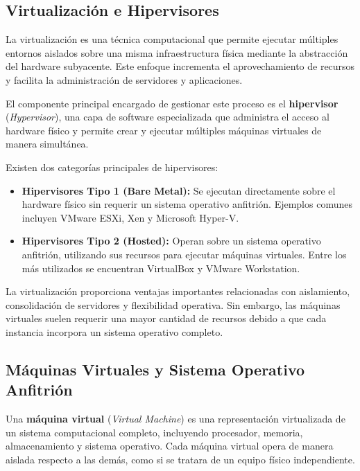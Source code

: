 \subsection{Virtualización e Hipervisores}

La virtualización es una técnica computacional que permite ejecutar múltiples entornos aislados sobre una misma infraestructura física mediante la abstracción del hardware subyacente. Este enfoque incrementa el aprovechamiento de recursos y facilita la administración de servidores y aplicaciones.

El componente principal encargado de gestionar este proceso es el \textbf{hipervisor} (\textit{Hypervisor}), una capa de software especializada que administra el acceso al hardware físico y permite crear y ejecutar múltiples máquinas virtuales de manera simultánea.

Existen dos categorías principales de hipervisores:

\begin{itemize}
\item \textbf{Hipervisores Tipo 1 (Bare Metal):} Se ejecutan directamente sobre el hardware físico sin requerir un sistema operativo anfitrión. Ejemplos comunes incluyen VMware ESXi, Xen y Microsoft Hyper-V.

\item \textbf{Hipervisores Tipo 2 (Hosted):} Operan sobre un sistema operativo anfitrión, utilizando sus recursos para ejecutar máquinas virtuales. Entre los más utilizados se encuentran VirtualBox y VMware Workstation.
\end{itemize}

La virtualización proporciona ventajas importantes relacionadas con aislamiento, consolidación de servidores y flexibilidad operativa. Sin embargo, las máquinas virtuales suelen requerir una mayor cantidad de recursos debido a que cada instancia incorpora un sistema operativo completo.

\subsection{Máquinas Virtuales y Sistema Operativo Anfitrión}

Una \textbf{máquina virtual} (\textit{Virtual Machine}) es una representación virtualizada de un sistema computacional completo, incluyendo procesador, memoria, almacenamiento y sistema operativo. Cada máquina virtual opera de manera aislada respecto a las demás, como si se tratara de un equipo físico independiente.

